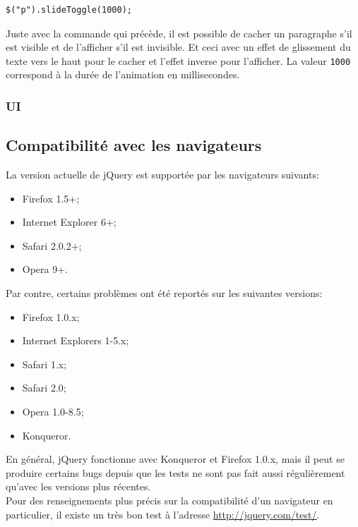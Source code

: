 \documentclass[10pt,a4paper,titlepage]{article}
\begin{document}
\begin{lstlisting}
$("p").slideToggle(1000);
\end{lstlisting}

Juste avec la commande qui précède, il est possible de cacher un paragraphe s'il est visible et de l'afficher s'il est invisible. Et ceci avec un effet de glissement du texte vers le haut pour le cacher et l'effet inverse pour l'afficher. La valeur \texttt{1000} correspond à la durée de l'animation en millisecondes.

\subsubsection{UI}

\subsection{Compatibilité avec les navigateurs}
La version actuelle de jQuery est supportée par les navigateurs suivants:

\begin{itemize}
	\item {Firefox 1.5+;}
	\item {Internet Explorer 6+;}
	\item {Safari 2.0.2+;}
	\item {Opera 9+.\\}
\end{itemize}

Par contre, certains problèmes ont été reportés sur les suivantes versions:
\begin{itemize}
	\item {Firefox 1.0.x;}
	\item {Internet Explorers 1-5.x;}
	\item {Safari 1.x;}
	\item {Safari 2.0;}
	\item {Opera 1.0-8.5;}
	\item {Konqueror.\\}
\end{itemize}

En général, jQuery fonctionne avec Konqueror et Firefox 1.0.x, mais il peut se produire certains bugs depuis que les tests ne sont pas fait aussi régulièrement qu'avec les versions plus récentes.\\

Pour des renseignements plus précis sur la compatibilité d'un navigateur en particulier, il existe un très bon test à l'adresse \url{http://jquery.com/test/}.
\end{document}
